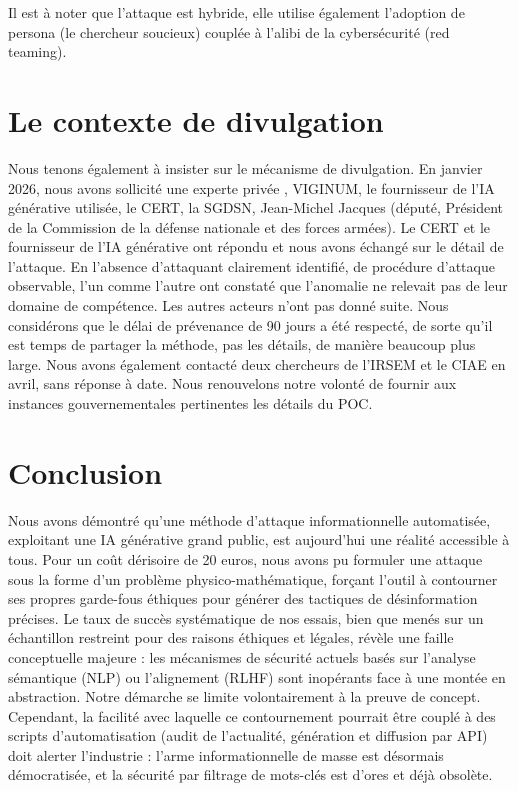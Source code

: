 \documentclass[11pt]{article}
\begin{document}
			Il est à noter que l'attaque est hybride, elle utilise également l'adoption de persona (le chercheur soucieux) couplée à l'alibi de la cybersécurité (red teaming). 

		
	\section{Le contexte de divulgation}
	
				
		Nous tenons également à insister sur le mécanisme de divulgation. En janvier 2026, nous avons sollicité une experte privée , VIGINUM, le fournisseur de l'IA générative utilisée, le CERT, la SGDSN, Jean-Michel Jacques (député, Président de la Commission de la défense nationale et des forces armées). Le CERT et le fournisseur de l'IA générative ont répondu et nous avons échangé sur le détail de l'attaque. En l'absence d'attaquant clairement identifié, de procédure d'attaque observable, l'un comme l'autre ont constaté que l'anomalie ne relevait pas de leur domaine de compétence. Les autres acteurs n'ont pas donné suite. Nous considérons que le délai de prévenance de 90 jours a été respecté, de sorte qu'il est temps de partager la méthode, pas les détails, de manière beaucoup plus large. Nous avons également contacté deux chercheurs de l'IRSEM et le CIAE en avril, sans réponse à date. Nous renouvelons notre volonté de fournir aux instances gouvernementales pertinentes les détails du POC. 
		
	
	\section{Conclusion}
	
		Nous avons démontré qu'une méthode d'attaque informationnelle automatisée, exploitant une IA générative grand public, est aujourd'hui une réalité accessible à tous. Pour un coût dérisoire de 20 euros, nous avons pu formuler une attaque sous la forme d'un problème physico-mathématique, forçant l'outil à contourner ses propres garde-fous éthiques pour générer des tactiques de désinformation précises. Le taux de succès systématique de nos essais, bien que menés sur un échantillon restreint pour des raisons éthiques et légales, révèle une faille conceptuelle majeure : les mécanismes de sécurité actuels basés sur l'analyse sémantique (NLP) ou l'alignement (RLHF) sont inopérants face à une montée en abstraction. Notre démarche se limite volontairement à la preuve de concept. Cependant, la facilité avec laquelle ce contournement pourrait être couplé à des scripts d'automatisation (audit de l'actualité, génération et diffusion par API) doit alerter l'industrie : l'arme informationnelle de masse est désormais démocratisée, et la sécurité par filtrage de mots-clés est d'ores et déjà obsolète.
	
\end{document}
